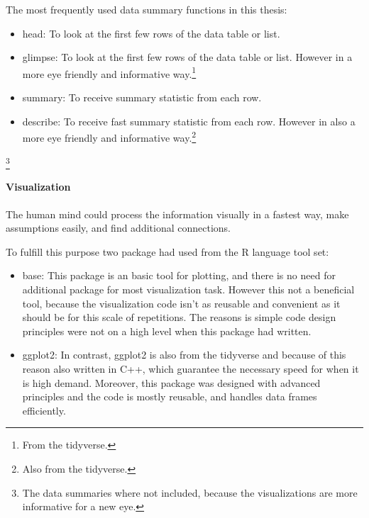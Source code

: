 		The most frequently used data summary functions in this thesis:
		\begin{itemize}
			\item{head:} To look at the first few rows of the data table or list.
			\item{glimpse:} To look at the first few rows of the data table or list. However in a more eye friendly and informative way.\footnote{From the tidyverse.}
			\item{summary:} To receive summary statistic from each row.
			\item{describe:} To receive fast summary statistic from each row. However in also a more eye friendly and informative way.\footnote{Also from the tidyverse.}
		\end{itemize}

		\footnote{The data summaries where not included, because the visualizations are more informative for a new eye.}
		\paragraph{Visualization}
		The human mind could process the information visually in a fastest way, make assumptions easily, and find additional connections. 

		To fulfill this purpose two package had used from the R language tool set:
		\begin{itemize}
			\item{base:} This package is an basic tool for plotting, and there is no need for additional package for most visualization task. However this not a beneficial tool, because the visualization code isn't as reusable and convenient as it should be for this scale of repetitions. The reasons is simple code design principles were not on a high level when this package had written.
			\item{ggplot2:} In contrast, ggplot2 is also from the tidyverse and because of this reason also written in C++, which guarantee the necessary speed for when it is high demand. Moreover, this package was designed with advanced principles and the code is mostly reusable, and handles data frames efficiently. 
		\end{itemize} 


